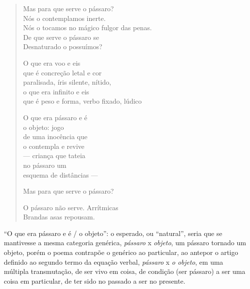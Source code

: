 \begin{verse}
Mas para que serve o pássaro?\\
Nós o contemplamos inerte.\\
Nós o tocamos no mágico fulgor das penas.\\
De que serve o pássaro se\\
Desnaturado o possuímos?

O que era voo e eis\\
que é concreção letal e cor\\
paralisada, íris silente, nítido,\\
o que era inﬁnito e eis\\
que é peso e forma, verbo ﬁxado, lúdico

O que era pássaro e é\\
o objeto: jogo\\
de uma inocência que\\
o contempla e revive\\
--- criança que tateia\\
no pássaro um\\
esquema de distâncias ---

Mas para que serve o pássaro?

O pássaro não serve. Arrítmicas\\
Brandas asas repousam.
\end{verse}

``O que era pássaro e é / o objeto'': o esperado, ou ``natural'', seria
que se mantivesse a mesma categoria genérica, \emph{pássaro} x
\emph{objeto}, um pássaro tornado um objeto, porém o poema contrapõe o
genérico ao particular, ao antepor o artigo deﬁnido ao segundo termo da
equação verbal, \emph{pássaro} x \emph{o objeto}, em uma múltipla
transmutação, de ser vivo em coisa, de condição (ser pássaro) a ser uma
coisa em particular, de ter sido no passado a ser no presente.

